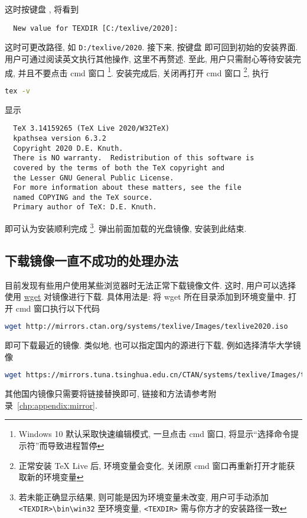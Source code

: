 这时按键盘 , 将看到
\begin{lstlisting}
  New value for TEXDIR [C:/texlive/2020]:
\end{lstlisting}
这时可更改路径, 如 \texttt{D:/texlive/2020}.
接下来, 按键盘  即可回到初始的安装界面. 
用户可通过阅读英文执行其他操作, 这里不再赘述. 
至此, 用户只需耐心等待安装完成, 并且不要点击 \textsf{cmd} 窗口%
\footnote{Windows 10 默认采取快速编辑模式, 一旦点击 \textsf{cmd} 窗口,
将显示``选择命令提示符''而导致进程暂停}. 
安装完成后, 关闭再打开 \textsf{cmd} 窗口%
\footnote{正常安装 \TeX{} Live 后, 环境变量会变化,
关闭原 \textsf{cmd} 窗口再重新打开才能获取新的环境变量},
执行
\begin{lstlisting}[language = bash]
  tex -v
\end{lstlisting}
显示
\begin{lstlisting}
  TeX 3.14159265 (TeX Live 2020/W32TeX)
  kpathsea version 6.3.2
  Copyright 2020 D.E. Knuth.
  There is NO warranty.  Redistribution of this software is
  covered by the terms of both the TeX copyright and
  the Lesser GNU General Public License.
  For more information about these matters, see the file
  named COPYING and the TeX source.
  Primary author of TeX: D.E. Knuth.
\end{lstlisting}
即可认为安装顺利完成%
\footnote{若未能正确显示结果, 则可能是因为环境变量未改变,
用户可手动添加 \texttt{<TEXDIR>\textbackslash bin\textbackslash win32} 至环境变量,
\texttt{<TEXDIR>} 需与你方才的安装路径一致}.
弹出前面加载的光盘镜像,
安装到此结束.

\subsection{下载镜像一直不成功的处理办法}

目前发现有些用户使用某些浏览器时无法正常下载镜像文件.
这时,
用户可以选择使用 \href{https://eternallybored.org/misc/wget/}{wget} 对镜像进行下载.
具体用法是:
将 \textsf{wget} 所在目录添加到环境变量中.
打开 \textsf{cmd} 窗口执行以下代码
\begin{lstlisting}[language = bash]
  wget http://mirrors.ctan.org/systems/texlive/Images/texlive2020.iso
\end{lstlisting}
即可下载最近的镜像.
类似地,
也可以指定国内的源进行下载,
例如选择清华大学镜像
\begin{lstlisting}[language = bash]
  wget https://mirrors.tuna.tsinghua.edu.cn/CTAN/systems/texlive/Images/texlive2020.iso
\end{lstlisting}
其他国内镜像只需要将链接替换即可,
链接和方法请参考附录~\ref{chp:appendix:mirror}.

